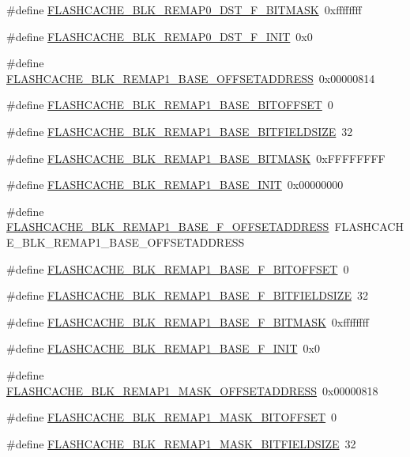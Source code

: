 \begin{DoxyCompactItemize}
\item 
\#define \hyperlink{a00550_aa8d85eb9179be4c391df957110ba07e7}{FLASHCACHE\_\-BLK\_\-REMAP0\_\-DST\_\-F\_\-BITMASK}~0xffffffff
\item 
\#define \hyperlink{a00550_aa2d51b60b4c877e29475e3af5c52190d}{FLASHCACHE\_\-BLK\_\-REMAP0\_\-DST\_\-F\_\-INIT}~0x0
\item 
\#define \hyperlink{a00550_a6b8ce26c67b750ed12258c52d0efae72}{FLASHCACHE\_\-BLK\_\-REMAP1\_\-BASE\_\-OFFSETADDRESS}~0x00000814
\item 
\#define \hyperlink{a00550_a55d088aad29a56414bdd876f144607f1}{FLASHCACHE\_\-BLK\_\-REMAP1\_\-BASE\_\-BITOFFSET}~0
\item 
\#define \hyperlink{a00550_a508b7f0a18858f15e2bf9792a91ac381}{FLASHCACHE\_\-BLK\_\-REMAP1\_\-BASE\_\-BITFIELDSIZE}~32
\item 
\#define \hyperlink{a00550_a78cfdbcc1ff6fc81f1a580e08d277a35}{FLASHCACHE\_\-BLK\_\-REMAP1\_\-BASE\_\-BITMASK}~0xFFFFFFFF
\item 
\#define \hyperlink{a00550_a180fc5a0fa8d503652cb4202638843b0}{FLASHCACHE\_\-BLK\_\-REMAP1\_\-BASE\_\-INIT}~0x00000000
\item 
\#define \hyperlink{a00550_ad3e9fbab37c97e538a421805a727c52d}{FLASHCACHE\_\-BLK\_\-REMAP1\_\-BASE\_\-F\_\-OFFSETADDRESS}~FLASHCACHE\_\-BLK\_\-REMAP1\_\-BASE\_\-OFFSETADDRESS
\item 
\#define \hyperlink{a00550_a86fe7e1cffbfca2a8fa37affd9fd2114}{FLASHCACHE\_\-BLK\_\-REMAP1\_\-BASE\_\-F\_\-BITOFFSET}~0
\item 
\#define \hyperlink{a00550_a8d09840e766fd2bb25cd859a25951123}{FLASHCACHE\_\-BLK\_\-REMAP1\_\-BASE\_\-F\_\-BITFIELDSIZE}~32
\item 
\#define \hyperlink{a00550_a03255d9d6443bed71bdbfcaceca357c0}{FLASHCACHE\_\-BLK\_\-REMAP1\_\-BASE\_\-F\_\-BITMASK}~0xffffffff
\item 
\#define \hyperlink{a00550_ad8d179d4b44882cea274c043d94162ca}{FLASHCACHE\_\-BLK\_\-REMAP1\_\-BASE\_\-F\_\-INIT}~0x0
\item 
\#define \hyperlink{a00550_a6ccc406c114eb1f8de97009b1c349b83}{FLASHCACHE\_\-BLK\_\-REMAP1\_\-MASK\_\-OFFSETADDRESS}~0x00000818
\item 
\#define \hyperlink{a00550_a233efbf2a95d62e17b408a648720d16a}{FLASHCACHE\_\-BLK\_\-REMAP1\_\-MASK\_\-BITOFFSET}~0
\item 
\#define \hyperlink{a00550_a3e37380def54c8a2a36f1b3a02875bca}{FLASHCACHE\_\-BLK\_\-REMAP1\_\-MASK\_\-BITFIELDSIZE}~32
\item 

\end{DoxyCompactItemize}
